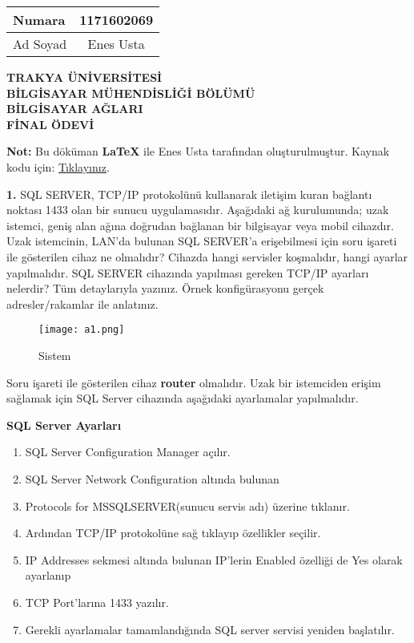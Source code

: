 \documentclass[a4paper,10pt]{article}
\begin{document}
  \begin{tabular}{ l | c }
    \hline
    Numara & 1171602069 \\ \hline
    Ad Soyad & Enes Usta \\
    \hline
  \end{tabular}

\begin{center}
\textbf{TRAKYA ÜNİVERSİTESİ} \\
\textbf{BİLGİSAYAR MÜHENDİSLİĞİ BÖLÜMÜ} \\
\textbf{BİLGİSAYAR AĞLARI} \\
\textbf{FİNAL ÖDEVİ}
\end{center}

\begin{center}
\textbf{Not:} Bu döküman \textbf{LaTeX} ile Enes Usta tarafından oluşturulmuştur.
Kaynak kodu için: \href{https://github.com/enesusta/bahar-donemi-final/blob/master/bilgisayar-aglari.tex}{Tıklayınız}.
\end{center}

\textbf{1.} SQL SERVER, TCP/IP protokolünü kullanarak iletişim kuran bağlantı noktası 1433 olan bir
sunucu uygulamasıdır. Aşağıdaki ağ kurulumunda; uzak istemci, geniş alan ağına doğrudan
bağlanan bir bilgisayar veya mobil cihazdır. Uzak istemcinin, LAN’da bulunan SQL SERVER’a
erişebilmesi için soru işareti ile gösterilen cihaz ne olmalıdır? Cihazda hangi servisler
koşmalıdır, hangi ayarlar yapılmalıdır. SQL SERVER cihazında yapılması gereken TCP/IP
ayarları nelerdir? Tüm detaylarıyla yazınız. Örnek konfigürasyonu gerçek adresler/rakamlar
ile anlatınız.


\begin{figure}[htb]
\begin{center}
\texttt{[image: a1.png]}
\end{center}
\caption{Sistem}
\label{fig:Sistem}
\end{figure}

\vspace{0.5cm}

Soru işareti ile gösterilen cihaz \textbf{router} olmalıdır. Uzak bir istemciden erişim sağlamak için SQL Server
cihazında aşağıdaki ayarlamalar yapılmalıdır.

\vspace{1cm}

\textbf{SQL Server Ayarları}

\begin{enumerate}
  \item SQL Server Configuration Manager açılır.
  \item SQL Server Network Configuration altında bulunan
\item Protocols for MSSQLSERVER(sunucu servis adı) üzerine tıklanır.
 \item Ardından TCP/IP protokolüne sağ tıklayıp
özellikler seçilir.
 \item IP Addresses sekmesi altında bulunan IP’lerin Enabled özelliği de Yes olarak ayarlanıp
\item TCP Port’larına 1433 yazılır.
 \item Gerekli ayarlamalar tamamlandığında SQL server servisi yeniden başlatılır.
\end{enumerate}
\end{document}
